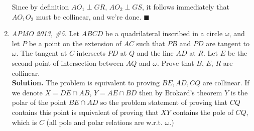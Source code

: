 \documentclass[11pt,a4paper]{article}
\begin{document}
\begin{enumerate}
Since by definition $AO_1\perp GR$, $AO_2\perp GS$, it follows immediately that $AO_1O_2$ must be collinear, and we're done. $\blacksquare$

\item\emph {APMO 2013, \#5.} Let $ABCD$ be a quadrilateral inscribed in a circle $\omega$, and let $P$ be a point on the extension of $AC$ such that $PB$ and $PD$ are tangent to $\omega$. The tangent at $C$ intersects $PD$ at $Q$ and the line $AD$ at $R$. Let $E$ be the second point of intersection between $AQ$ and $\omega$. Prove that $B$, $E$, $R$ are collinear.\\
\textbf {Solution.} The problem is equivalent to proving $BE, AD, CQ$ are collinear. If we denote $X=DE\cap AB$, $Y=AE\cap BD$ then by Brokard's theorem $Y$ is the polar of the point $BE\cap AD$ so the problem statement of proving that $CQ$ contains this point is equivalent of proving that $XY$ contains the pole of $CQ$, which is $C$ (all pole and polar relations are w.r.t.  $\omega$.)


\end{enumerate}
\end{document}
